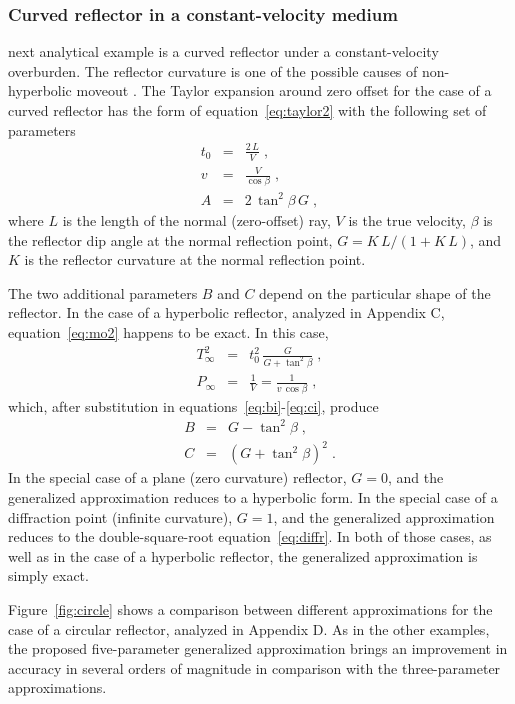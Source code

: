 \subsubsection{Curved reflector in a constant-velocity medium}

  next analytical example is a curved reflector under a
constant-velocity overburden. The reflector curvature is one of the
possible causes of non-hyperbolic moveout 
\cite[]{fandg}. The Taylor expansion around zero offset for 
the case of a curved reflector has the form of
equation~\ref{eq:taylor2} with the following set of parameters
\cite[]{fomel}
\begin{eqnarray}
\label{eq:ct}
t_0 & = & \frac{2\,L}{V}\;, \\
\label{eq:cv}
v & = & \frac{V}{\cos{\beta}}\;, \\
\label{eq:ca}
A & = & 2\,\tan^2{\beta}\,G\;, 
\end{eqnarray}
where $L$ is the length of the normal (zero-offset) ray, $V$ is the
true velocity, $\beta$ is the reflector dip angle at the normal
reflection point, $G=K\,L/(1+K\,L)$, and $K$ is the reflector
curvature at the normal reflection point. 

The two additional parameters $B$ and $C$ depend on the particular
shape of the reflector. In the case of a hyperbolic reflector,
analyzed in Appendix C, equation~\ref{eq:mo2} happens to be exact. In
this case, 
\begin{eqnarray}
\label{eq:ctinf}
T_{\infty}^2 & = & t_0^2\,\frac{G}{G+\tan^2{\beta}}\;, \\
\label{eq:cpinf}
P_{\infty} & = & \frac{1}{V} =  \frac{1}{v\,\cos{\beta}}\;, 
\end{eqnarray}
which, after substitution in equations~\ref{eq:bi}-\ref{eq:ci}, produce
\begin{eqnarray}
\label{eq:cb}
B & = & G - \tan^2{\beta}\;, \\
\label{eq:cc}
C & = & \left(G + \tan^2{\beta}\right)^2\;.
\end{eqnarray}
In the special case of a plane (zero curvature) reflector, $G=0$, and
the generalized approximation reduces to a hyperbolic form. In the
special case of a diffraction point (infinite curvature), $G=1$, and
the generalized approximation reduces to the double-square-root
equation~\ref{eq:diffr}. In both of those cases, as well as in the
case of a hyperbolic reflector, the generalized approximation is
simply exact.

Figure~\ref{fig:circle} shows a comparison between different
approximations for the case of a circular reflector, analyzed in
Appendix D.  As in the other examples, the proposed five-parameter
generalized approximation brings an improvement in accuracy in several
orders of magnitude in comparison with the three-parameter
approximations.

